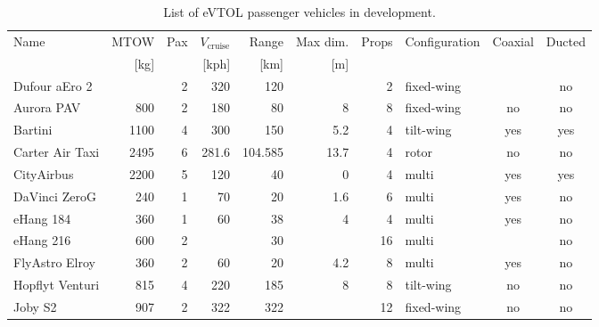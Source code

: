 \begin{table}[h]
\label{tab:evtolstats}
\captionsetup{justification=centering}
\caption{List of eVTOL passenger vehicles in development.}
\begin{tabular}{l|rrrrrrlcc}
\rowcolor{lightblue}
Name             & MTOW & Pax & $V_\text{cruise}$ & Range & Max dim. & Props & Configuration & Coaxial & Ducted \\
\rowcolor{lightblue}
 & {[}kg{]} & & {[}kph{]} & {[}km{]} & {[}m{]} & & & & \\\hline
Dufour aEro 2           &               & 2   & 320               & 120            &                  & 2     & fixed-wing    &         & no     \\
Aurora PAV          & 800           & 2   & 180               & 80             & 8                & 8     & fixed-wing    & no      & no     \\
Bartini \footnotemark          & 1100          & 4   & 300               & 150            & 5.2              & 4     & tilt-wing     & yes     & yes    \\
Carter Air Taxi  & 2495          & 6   & 281.6             & 104.585        & 13.7             & 4     & rotor         & no      & no     \\
CityAirbus       & 2200          & 5   & 120               & 40             & 0                & 4     & multi         & yes     & yes    \\
DaVinci ZeroG    & 240           & 1   & 70                & 20             & 1.6              & 6     & multi         & yes     & no     \\
eHang 184        & 360           & 1   & 60                & 38             & 4                & 4     & multi         & yes     & no     \\
eHang 216        & 600           & 2   &                   & 30             &                  & 16    & multi         &         & no     \\
FlyAstro Elroy            & 360           & 2   & 60                & 20             & 4.2              & 8     & multi         & yes     & no     \\
Hopflyt Venturi     & 815           & 4   & 220               & 185            & 8                & 8     & tilt-wing     & no      & no     \\
Joby S2          & 907           & 2   & 322               & 322            &                  & 12    & fixed-wing    & no      & no     \\

\end{tabular}
\end{table}
